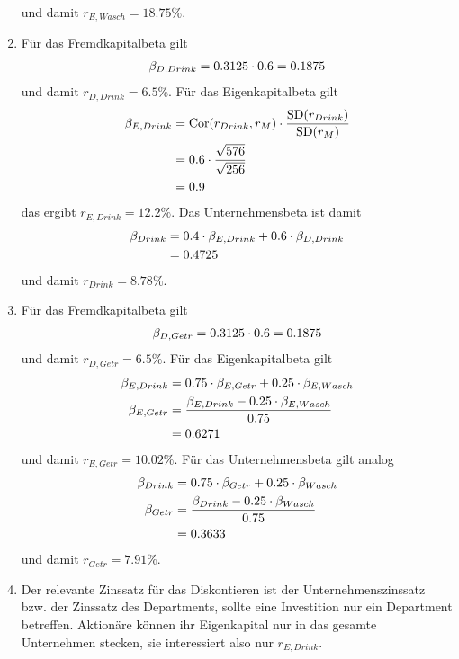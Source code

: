 \documentclass{article}
\DeclareMathOperator{\SD}{SD}
\DeclareMathOperator{\Cor}{Cor}
\begin{document}
\begin{enumerate}[label=(\alph*)]
		und damit $r_{E,Wasch}=18.75\%$.
		\item Für das Fremdkapitalbeta gilt
		\begin{align}
			\beta_{D,Drink} = 0.3125\cdot 0.6=0.1875\notag
		\end{align}
		und damit $r_{D,Drink}=6.5\%$. Für das Eigenkapitalbeta gilt
		\begin{align}
			\beta_{E,Drink} &= \Cor(r_{Drink}, r_M)\cdot\frac{\SD(r_{Drink})}{\SD(r_M)} \notag \\
			&= 0.6\cdot\frac{\sqrt{576}}{\sqrt{256}} \notag \\
			&= 0.9 \notag
		\end{align}
		das ergibt $r_{E,Drink}=12.2\%$. Das Unternehmensbeta ist damit
		\begin{align}
			\beta_{Drink} &= 0.4\cdot\beta_{E,Drink} + 0.6\cdot\beta_{D,Drink} \notag \\
			&= 0.4725\notag
		\end{align}
		und damit $r_{Drink}=8.78\%$.
		\item Für das Fremdkapitalbeta gilt
		\begin{align}
			\beta_{D,Getr} = 0.3125\cdot 0.6=0.1875\notag
		\end{align}
		und damit $r_{D,Getr}=6.5\%$. Für das Eigenkapitalbeta gilt
		\begin{align}
			\beta_{E,Drink} &= 0.75\cdot\beta_{E,Getr} + 0.25\cdot\beta_{E,Wasch} \notag \\
			\beta_{E,Getr} &= \frac{\beta_{E,Drink} - 0.25\cdot\beta_{E,Wasch}}{0.75} \notag \\
			&= 0.6271 \notag
		\end{align}
		und damit $r_{E,Getr}=10.02\%$. Für das Unternehmensbeta gilt analog
		\begin{align}
			\beta_{Drink} &= 0.75\cdot\beta_{Getr} + 0.25\cdot\beta_{Wasch} \notag \\
			\beta_{Getr} &= \frac{\beta_{Drink} - 0.25\cdot\beta_{Wasch}}{0.75} \notag \\
			&= 0.3633 \notag
		\end{align}
		und damit $r_{Getr}=7.91\%$.
		\item Der relevante Zinssatz für das Diskontieren ist der Unternehmenszinssatz bzw. der Zinssatz des Departments, sollte eine Investition nur ein Department betreffen. Aktionäre können ihr Eigenkapital nur in das gesamte Unternehmen stecken, sie interessiert also nur $r_{E,Drink}$.
	\end{enumerate}
\end{document}
